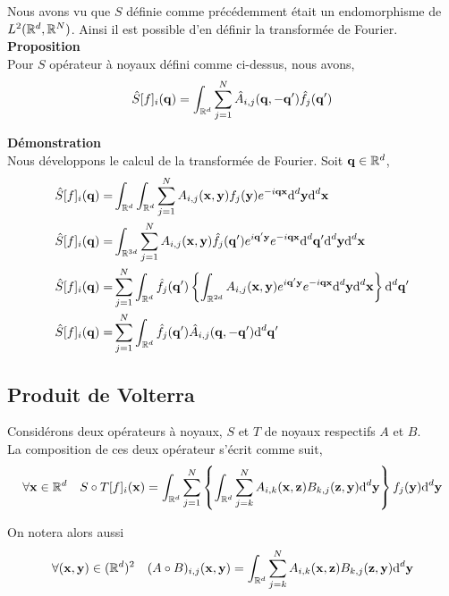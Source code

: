 \documentclass[10pt]{article}
\begin{document}
Nous avons vu que $S$ définie comme précédemment était un endomorphisme de $L^2(\mathbb{R}^d, \mathbb{R}^N)$. Ainsi il est possible d'en définir la transformée de Fourier. \\

\textbf{Proposition}\\
Pour $S$ opérateur à noyaux défini comme ci-dessus, nous avons,
\begin{equation}
  \hat{S}[f]_i({\bf q}) = \int_{\mathbb{R}^d} \sum_{j=1}^{N} \hat{A}_{i,j}({\bf q}, -{\bf q}') \hat{f}_j({\bf q}')
\end{equation}



\textbf{Démonstration}\\
Nous développons le calcul de la transformée de Fourier. Soit ${\bf q} \in \mathbb{R}^d$,
\begin{align}
 \hat{S}[f]_i({\bf q})  = & \int_{\mathbb{R}^d} \int_{\mathbb{R}^d} \sum_{j=1}^{N} A_{i,j}({\bf x},{\bf y})f_j({\bf y}) e^{-i{\bf q}{\bf x}} \text{d}^d {\bf y} \text{d}^d {\bf x} \\
 \hat{S}[f]_i({\bf q})  = & \int_{\mathbb{R}^{3d}} \sum_{j=1}^{N} A_{i,j}({\bf x},{\bf y}) \hat{f}_j({\bf q}') e^{i{\bf q}'{\bf y}} e^{- i{\bf q}{\bf x}}  \text{d}^d {\bf q}' \text{d}^d {\bf y} \text{d}^d {\bf x} \\
 \hat{S}[f]_i({\bf q})  = &    \sum_{j=1}^{N} \int_{\mathbb{R}^d} \hat{f}_j({\bf q}') \left\{ \int_{\mathbb{R}^{2d}} A_{i,j}({\bf x},{\bf y})  e^{i{\bf q}'{\bf y}} e^{- i{\bf q}{\bf x}}  \text{d}^d {\bf y} \text{d}^d {\bf x}   \right\} \text{d}^d {\bf q}'\\
\hat{S}[f]_i({\bf q})  = &    \sum_{j=1}^{N} \int_{\mathbb{R}^d} \hat{f}_j({\bf q}') \hat{A}_{i,j}({\bf q}, -{\bf q}') \text{d}^d {\bf q}'\\
\end{align}

\vspace*{11pt}

\subsection{Produit de Volterra}

Considérons deux opérateurs à noyaux, $S$ et $T$ de noyaux respectifs $A$ et $B$. \\
La composition de ces deux opérateur s'écrit comme suit,
\begin{equation}
  \forall {\bf x} \in \mathbb{R}^d \quad S \circ T [f]_i ({\bf x}) = \int_{\mathbb{R}^d}  \sum_{j=1}^{N} \left\{ \int_{\mathbb{R}^d} \sum_{j=k}^{N}A_{i,k}({\bf x}, {\bf z})B_{k,j}({\bf z}, {\bf y})  \text{d}^d {\bf y} \right\} f_j({\bf y})  \text{d}^d {\bf y}
\end{equation}

On notera alors aussi
\begin{equation}
    \forall ({\bf x}, {\bf y}) \in (\mathbb{R}^d)^2 \quad (A \circ B)_{i,j} ({\bf x}, {\bf y}) = \int_{\mathbb{R}^d} \sum_{j=k}^{N}A_{i,k}({\bf x}, {\bf z})B_{k,j}({\bf z}, {\bf y})  \text{d}^d {\bf y} 
\end{equation}
\end{document}
